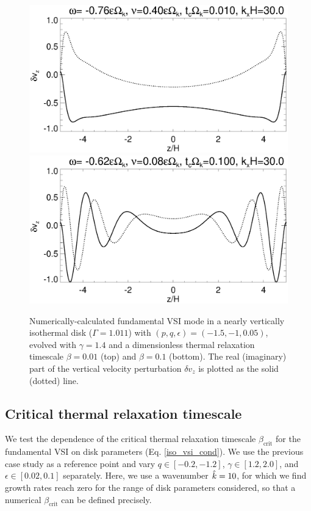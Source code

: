 \begin{figure}
  \includegraphics[width=\linewidth,clip=true,trim=0cm 1.75cm 0cm
  0cm]{figures/eigenvectorvz_beta0d01} 
  \includegraphics[width=\linewidth,clip=true,trim=0cm 0cm 0cm
  0cm]{figures/eigenvectorvz_beta0d1} 
  \caption{Numerically-calculated fundamental VSI
    mode in a nearly vertically isothermal disk ($\Gamma=1.011$) with
    $(p,q,\epsilon)=(-1.5,-1,0.05)$, evolved with $\gamma=1.4$ and a dimensionless 
    thermal relaxation timescale $\beta = 0.01$
    (top) and $\beta=0.1$ (bottom). The
    real (imaginary) part of the vertical velocity perturbation
    $\delta v_z$ is plotted as the solid (dotted)
    line. %
    \label{relax_eigenW_num}}  
\end{figure}

\subsection{Critical thermal relaxation timescale}\label{bcrit_num_test}
We test the dependence of the critical thermal relaxation timescale 
$\beta_\mathrm{crit}$ for the fundamental VSI on disk parameters
(Eq. \ref{iso_vsi_cond}).  We use the previous case study as a
reference point and vary $q\in[-0.2,-1.2]$, 
$\gamma\in[1.2,2.0]$, and $\epsilon\in[0.02,0.1]$
separately. Here, we use a wavenumber $\hat{k}=10$, for which we
find growth rates reach zero for the range of disk parameters
considered, so that a numerical $\beta_\mathrm{crit}$ can be defined precisely. 

